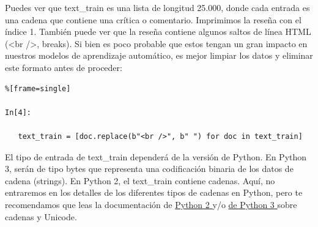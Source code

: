 






Puedes ver que {\ttfamily text\_train} es una lista de longitud 25.000, donde cada entrada es una cadena que contiene una crítica o comentario. Imprimimos la reseña con el índice 1. También puede ver que la reseña contiene algunos saltos de línea HTML (<br />, breaks). Si bien es poco probable que estos tengan un gran impacto en nuestros modelos de aprendizaje automático, es mejor limpiar los datos y eliminar este formato antes de proceder:

\begin{lstlisting}%[frame=single]

In[4]:

   text_train = [doc.replace(b"<br />", b" ") for doc in text_train]

\end{lstlisting}


El tipo de  entrada de {\ttfamily text\_train} dependerá de la versión de Python. En Python 3, serán de tipo bytes  que representa una codificación binaria de los datos de cadena (strings). En Python 2, el {\ttfamily text\_train} contiene cadenas. Aquí, no entraremos en los detalles de los diferentes tipos de cadenas en Python, pero te recomendamos que leas la documentación de \href{https://docs.python.org/2/howto/unicode.html}{\textcolor{vino}{ Python 2} }  y/o  \href{https://docs.python.org/3/howto/unicode.html}{\textcolor{vino}{ de Python 3} } sobre cadenas y Unicode.\\

